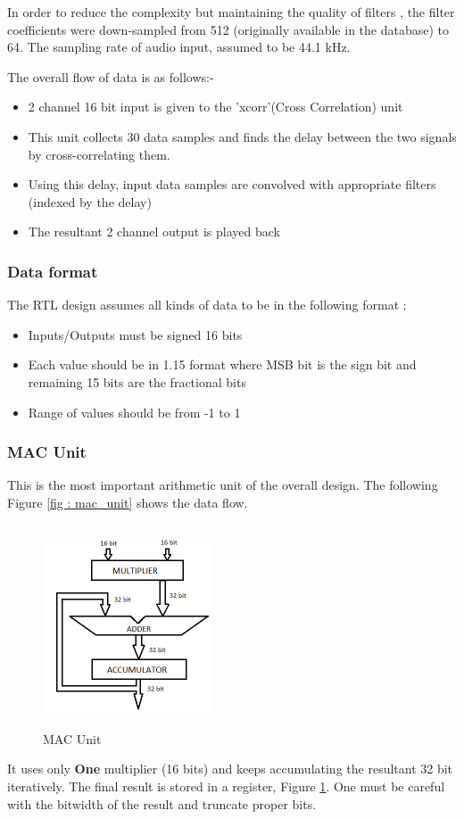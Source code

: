 \documentclass[BTech]{nitkdiss}
\begin{document}
In order to reduce the complexity but maintaining the quality of filters , the filter coefficients were down-sampled from 512 (originally available in the database) to 64. The sampling rate of audio input, assumed to be 44.1 kHz. \newline


The overall flow of data is as follows:- 
\begin{itemize}
\item 2 channel 16 bit input is given to the 'xcorr'(Cross Correlation) unit 
\item This unit collects 30 data samples and finds the delay between the two signals by cross-correlating them.
\item Using this delay, input data samples are convolved with appropriate filters (indexed by the delay) 
\item The resultant 2 channel output is played back
\end{itemize} 
\subsubsection{Data format}The RTL design assumes all kinds of data to be in the following format : 
\begin{itemize}
    \item Inputs/Outputs must be signed 16 bits 
    \item Each value should be in 1.15 format where MSB bit is the sign bit and remaining 15 bits are the fractional bits
    \item Range of values should be from -1 to 1 
\end{itemize}

\subsubsection{MAC Unit}
This is the most important arithmetic unit of the overall design. The following Figure \ref{fig : mac_unit} shows the data flow. 
\begin{figure}[h!]
\centering
\includegraphics[width = 5cm, height = 6cm]{mac}
\caption{MAC Unit}
\label{fig : mac}
\end{figure}
It uses only \textbf{One} multiplier (16 bits) and keeps accumulating the resultant 32 bit iteratively. The final result is stored in a register, Figure \ref{fig : mac}. One must be careful with the bitwidth of the result and truncate proper bits. 
\end{document}
